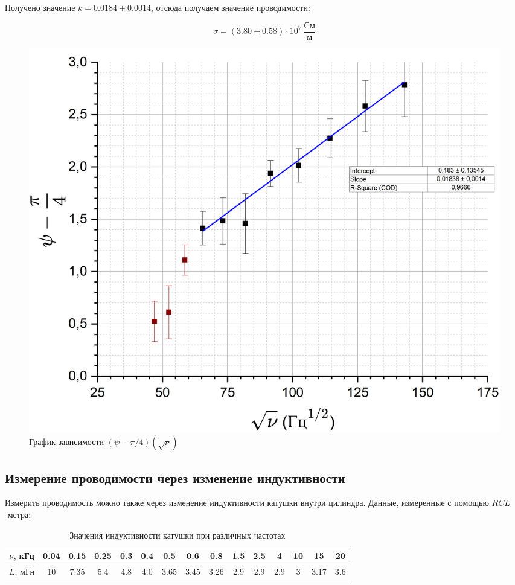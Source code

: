 \documentclass[a4paper, 12pt]{article}
\begin{document}
	Получено значение $k = 0.0184 \pm 0.0014$, отсюда получаем значение проводимости:
	
	\begin{equation}
		\sigma = (3.80 \pm 0.58) \cdot 10^7 \ \frac{\text{См}}{\text{м}}
	\end{equation}
	
	\begin{figure}[h]
		\centering
		\includegraphics[width=\textwidth]{High_freq}
		\caption{График зависимости $(\psi - \pi/4)(\sqrt{\nu})$}
		\newpage
	\end{figure}
	
	\subsection*{Измерение проводимости через изменение индуктивности}
	Измерить проводимость можно также через изменение индуктивности катушки внутри цилиндра. Данные, измеренные с помощью $RCL$-метра:
	
	\begin{table}[h!]
		\centering
		\begin{tabular}{|c|c|c|c|c|c|c|c|c|c|c|c|c|c|c|}
			\hline
			$\nu$, кГц & 0.04 & 0.15 & 0.25 & 0.3 & 0.4 & 0.5 & 0.6 & 0.8 & 1.5 & 2.5 & 4 & 10 & 15 & 20 \\
			\hline
			$L$, мГн & 10 & 7.35 & 5.4 & 4.8 & 4.0  & 3.65 & 3.45 & 3.26 & 2.9 & 2.9 & 2.9 & 3 & 3.17 & 3.6 \\
			\hline
		\end{tabular}
		\caption{Значения индуктивности катушки при различных частотах}
	\end{table}
	
\end{document}
